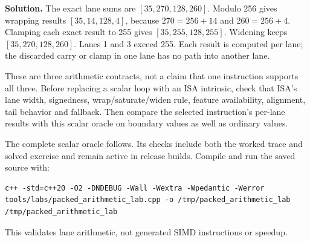 \textbf{Solution.} The exact lane sums are \([35,270,128,260]\). Modulo 256 gives wrapping results \([35,14,128,4]\), because \(270=256+14\) and \(260=256+4\). Clamping each exact result to 255 gives \([35,255,128,255]\). Widening keeps \([35,270,128,260]\). Lanes 1 and 3 exceed 255. Each result is computed per lane; the discarded carry or clamp in one lane has no path into another lane.

These are three arithmetic contracts, not a claim that one instruction supports all three. Before replacing a scalar loop with an ISA intrinsic, check that ISA's lane width, signedness, wrap/saturate/widen rule, feature availability, alignment, tail behavior and fallback. Then compare the selected instruction's per-lane results with this scalar oracle on boundary values as well as ordinary values.

The complete scalar oracle follows. Its checks include both the worked trace and solved exercise and remain active in release builds. Compile and run the saved source with:

\begin{verbatim}
c++ -std=c++20 -O2 -DNDEBUG -Wall -Wextra -Wpedantic -Werror tools/labs/packed_arithmetic_lab.cpp -o /tmp/packed_arithmetic_lab
/tmp/packed_arithmetic_lab
\end{verbatim}

This validates lane arithmetic, not generated SIMD instructions or speedup.

